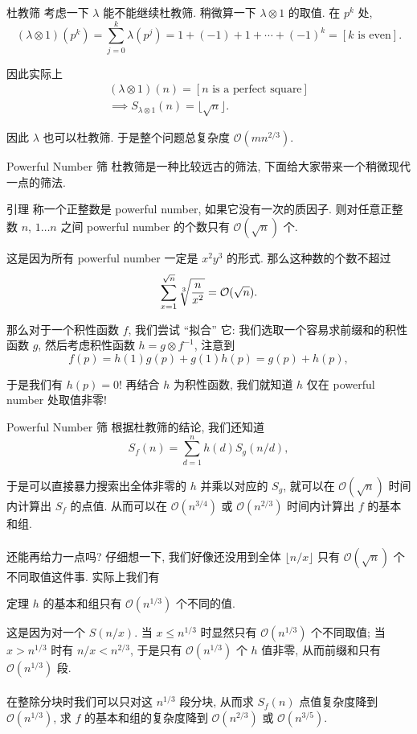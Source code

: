 \documentclass{beamer}
\newcommand{\nl}{\\\hspace*{\fill}\\}
\begin{document}
    \begin{frame}{杜教筛}
        考虑一下 $\lambda$ 能不能继续杜教筛. 稍微算一下 $\lambda\otimes 1$ 的取值. 在 $p^k$ 处,
        $$
        (\lambda\otimes 1)(p^k)=\sum_{j=0}^k\lambda(p^j)=1+(-1)+1+\cdots+(-1)^k=[k\text{ is even}].
        $$

        因此实际上
        \begin{gather*}
            (\lambda\otimes 1)(n)=[n\text{ is a perfect square}]\\
            \implies S_{\lambda\otimes 1}(n)=\lfloor\sqrt n\rfloor.
        \end{gather*}

        因此 $\lambda$ 也可以杜教筛. 于是整个问题总复杂度 $\mathcal O(mn^{2/3})$.
    \end{frame}

    \begin{frame}{Powerful Number 筛}
        杜教筛是一种比较远古的筛法, 下面给大家带来一个稍微现代一点的筛法.
        \pause
        \begin{block}{引理}
            称一个正整数是 powerful number, 如果它没有一次的质因子. 则对任意正整数 $n$, $1\dots n$ 之间 powerful number 的个数只有 $\mathcal O(\sqrt n)$ 个.
        \end{block}
        这是因为所有 powerful number 一定是 $x^2y^3$ 的形式. 那么这种数的个数不超过
        $$
        \sum_{x=1}^{\sqrt n}\sqrt[3]{n\over x^2}=\mathcal O(\sqrt n).
        $$

        那么对于一个积性函数 $f$, 我们尝试 ``拟合'' 它: 我们选取一个容易求前缀和的积性函数 $g$, 然后考虑积性函数 $h=g\otimes f^{-1}$, 注意到
        $$
        f(p)=h(1)g(p)+g(1)h(p)=g(p)+h(p),
        $$

        于是我们有 $h(p)=0$! 再结合 $h$ 为积性函数, 我们就知道 $h$ 仅在 powerful number 处取值非零!
    \end{frame}

    \begin{frame}{Powerful Number 筛}
        根据杜教筛的结论, 我们还知道
        $$
        S_f(n)=\sum_{d=1}^n h(d)S_g(n/d),
        $$

        于是可以直接暴力搜索出全体非零的 $h$ 并乘以对应的 $S_g$, 就可以在 $\mathcal O(\sqrt n)$ 时间内计算出 $S_f$ 的点值. 从而可以在 $\mathcal O(n^{3/4})$ 或 $\mathcal O(n^{2/3})$ 时间内计算出 $f$ 的基本和组.\nl
        \pause
        还能再给力一点吗? 仔细想一下, 我们好像还没用到全体 $\lfloor n/x\rfloor$ 只有 $\mathcal O(\sqrt n)$ 个不同取值这件事. 实际上我们有
        \begin{block}{定理}
            $h$ 的基本和组只有 $\mathcal O(n^{1/3})$ 个不同的值.
        \end{block}
        这是因为对一个 $S(n/x)$. 当 $x\leq n^{1/3}$ 时显然只有 $\mathcal O(n^{1/3})$ 个不同取值; 当 $x>n^{1/3}$ 时有 $n/x<n^{2/3}$, 于是只有 $\mathcal O(n^{1/3})$ 个 $h$ 值非零, 从而前缀和只有 $\mathcal O(n^{1/3})$ 段.\nl
        在整除分块时我们可以只对这 $n^{1/3}$ 段分块, 从而求 $S_f(n)$ 点值复杂度降到 $\mathcal O(n^{1/3})$, 求 $f$ 的基本和组的复杂度降到 $\mathcal O(n^{2/3})$ 或 $\mathcal O(n^{3/5})$.
    \end{frame}
\end{document}
